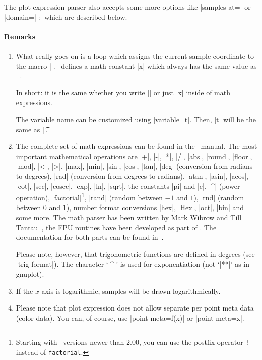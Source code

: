 {\begin{addplotoperation}[]{}{}
The plot expression parser also accepts some more options like |samples at=| or |domain=||:| which are described below.

\paragraph{Remarks}
\begin{enumerate} 
	\item What really goes on is a loop which assigns the current sample coordinate to the macro |\x|. \PGFPlots\ defines a math constant |x| which always has the same value as |\x|.

	In short: it is the same whether you write |\x| or just |x| inside of math expressions.

	The variable name can be customized using |variable=t|. Then, |t| will be the same as |\t|.
%

	\item The complete set of math expressions can be found in the \PGF\ manual. The most important mathematical operations are
	|+|, |-|, |*|, |/|, |abs|, |round|, |floor|, |mod|, |<|, |>|, |max|, |min|, |sin|, |cos|, |tan|, |deg| (conversion from radians to degrees), |rad| (conversion from degrees to radians), |atan|, |asin|, |acos|, |cot|, |sec|, |cosec|, |exp|, |ln|, |sqrt|, the constants |pi| and |e|, |^| (power operation), |factorial|\footnote{Starting with \PGF\ versions newer than $2.00$, you can use the postfix operator \texttt{!} instead of \texttt{factorial}.}, |rand| (random between $-1$ and $1$), |rnd| (random between $0$ and $1$), number format conversions |hex|, |Hex|, |oct|, |bin| and some more. The math parser has been written by Mark Wibrow and Till Tantau~\cite{tikz}, the FPU routines have been developed as part of \PGFPlots. The documentation for both parts can be found in~\cite{tikz}.
	
	Please note, however, that trigonometric functions are defined in degrees (see |trig format|). The character `|^|' is used for exponentiation (not `|**|' as in gnuplot).

	\item If the $x$ axis is logarithmic, samples will be drawn logarithmically.

	\item Please note that plot expression does not allow separate per point meta data (color data). You can, of course, use |point meta=f(x)| or |point meta=x|.
\end{enumerate}


\end{addplotoperation}}
